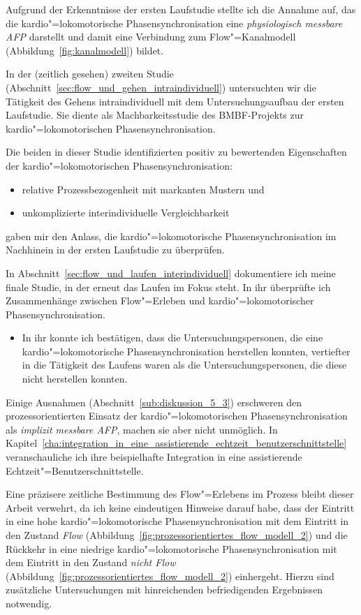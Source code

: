Aufgrund der Erkenntnisse der ersten Laufstudie stellte ich die Annahme auf, das die kardio"=lokomotorische Phasensynchronisation eine \emph{physiologisch messbare \ac{AFP}} darstellt und damit eine Verbindung zum Flow"=Kanalmodell (Abbildung~\ref{fig:kanalmodell}) bildet.

In der (zeitlich gesehen) zweiten Studie (Abschnitt~\ref{sec:flow_und_gehen_intraindividuell}) untersuchten wir die Tätigkeit des Gehens intraindividuell mit dem Untersuchungsaufbau der ersten Laufstudie. Sie diente als Machbarkeitsstudie des \acs{BMBF}-Projekts zur kardio"=lokomotorischen Phasensynchronisation. 

Die beiden in dieser Studie identifizierten positiv zu bewertenden Eigenschaften der kardio"=lokomotorischen Phasensynchronisation: 
\begin{itemize}
	
	\item relative Prozessbezogenheit mit markanten Mustern und
	
	\item unkomplizierte interindividuelle Vergleichbarkeit 
\end{itemize}

gaben mir den Anlass, die kardio"=lokomotorische Phasensynchronisation im Nachhinein in der ersten Laufstudie zu überprüfen. 

In Abschnitt~\ref{sec:flow_und_laufen_interindividuell} dokumentiere ich meine finale Studie, in der erneut das Laufen im Fokus steht. In ihr überprüfte ich Zusammenhänge zwischen Flow"=Erleben und kardio"=lokomotorischer Phasensynchronisation. 
\begin{itemize}
	
	\item In ihr konnte ich bestätigen, dass die Untersuchungspersonen, die eine kardio"=lokomotorische Phasensynchronisation herstellen konnten, vertiefter in die Tätigkeit des Laufens waren als die Untersuchungspersonen, die diese nicht herstellen konnten. 
\end{itemize}

Einige Ausnahmen (Abschnitt~\ref{sub:diskussion_5_3}) erschweren den prozessorientierten Einsatz der kardio"=lokomotorischen Phasensynchronisation als \emph{implizit messbare \ac{AFP}}, machen sie aber nicht unmöglich. In Kapitel~\ref{cha:integration_in_eine_assistierende_echtzeit_benutzerschnittstelle} veranschauliche ich ihre beispielhafte Integration in eine assistierende Echtzeit"=Benutzerschnittstelle.

Eine präzisere zeitliche Bestimmung des Flow"=Erlebens im Prozess bleibt dieser Arbeit verwehrt, da ich keine eindeutigen Hinweise darauf habe, dass der Eintritt in eine hohe kardio"=lokomotorische Phasensynchronisation mit dem Eintritt in den Zustand \emph{Flow} (Abbildung~\ref{fig:prozessorientiertes_flow_modell_2}) und die Rückkehr in eine niedrige kardio"=lokomotorische Phasensynchronisation mit dem Eintritt in den Zustand \emph{nicht Flow} (Abbildung~\ref{fig:prozessorientiertes_flow_modell_2}) einhergeht. Hierzu sind zusätzliche Untersuchungen mit hinreichenden befriedigenden Ergebnissen notwendig. 
